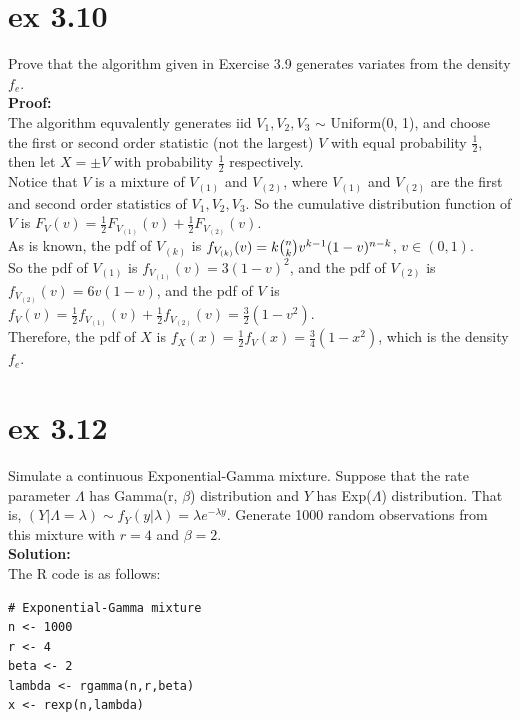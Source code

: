 \documentclass[UTF8]{ctexart}
\begin{document}
\section{ex 3.10}
Prove that the algorithm given in Exercise 3.9 generates variates from the density $f_e$.\\
\textbf{Proof:}\\
The algorithm equvalently generates iid $V_1, V_2, V_3$ $\sim$ Uniform(0, 1), and choose the first or second order statistic (not the largest) $V$ with equal probability $\frac{1}{2}$, then
let $X = \pm V$ with probability $\frac{1}{2}$ respectively.\\
Notice that $V$ is a mixture of $V_{(1)}$ and $V_{(2)}$, where $V_{(1)}$ and $V_{(2)}$ are the first and second order statistics of $V_1, V_2, V_3$.
So the cumulative distribution function of $V$ is $ F_V(v) = \frac{1}{2}F_{V_{(1)}}(v) + \frac{1}{2}F_{V_{(2)}}(v)$.\\
As is known, the pdf of $V_{(k)}$ is $f_{V_{(k)}}(v) = k \tbinom{n}{k} v^{k-1}(1-v)^{n-k}$, $v \in (0, 1)$.\\
So the pdf of $V_{(1)}$ is $f_{V_{(1)}}(v) = 3(1-v)^2$, and the pdf of $V_{(2)}$ is $f_{V_{(2)}}(v) = 6v(1-v)$, and the pdf of
$V$ is $f_V(v) = \frac{1}{2}f_{V_{(1)}}(v) + \frac{1}{2}f_{V_{(2)}}(v) = \frac{3}{2}(1-v^2)$.\\
Therefore, the pdf of $X$ is $f_X(x) = \frac{1}{2}f_V(x) = \frac{3}{4}(1-x^2)$, which is the density $f_e$.

\section{ex 3.12}
Simulate a continuous Exponential-Gamma mixture. Suppose that the rate
parameter $\Lambda$ has Gamma(r, $\beta$) distribution and $Y$ has Exp($\Lambda$) distribution.
That is, $(Y|\Lambda = \lambda) \sim f_Y (y|\lambda) = \lambda e^{-\lambda y}$. Generate 1000 random observations
from this mixture with $r = 4$ and $\beta = 2$.\\
\textbf{Solution:}\\
The R code is as follows:
\begin{lstlisting}
# Exponential-Gamma mixture
n <- 1000
r <- 4
beta <- 2
lambda <- rgamma(n,r,beta)
x <- rexp(n,lambda)
\end{lstlisting}
\end{document}
